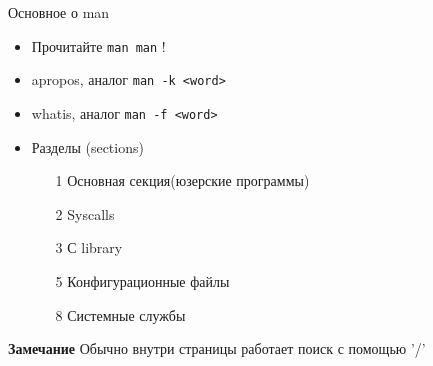 \begin{frame}[fragile]{Основное о man}
		\begin{itemize}
			\item Прочитайте {\tt man man} !
			\item apropos, аналог {\tt man -k <word>}
                        \item whatis, аналог {\tt man -f <word>} 
			\item Разделы (sections)
				\begin{itemize}
					\item[1] Основная секция(юзерские программы)
					\item[2] Syscalls
					\item[3] С library
					\item[5] Конфигурационные файлы
					\item[8] Системные службы
				\end{itemize}
		\end{itemize}
	  \textbf{Замечание}
	  Обычно внутри страницы работает поиск с помощью '/'
	
\end{frame}


